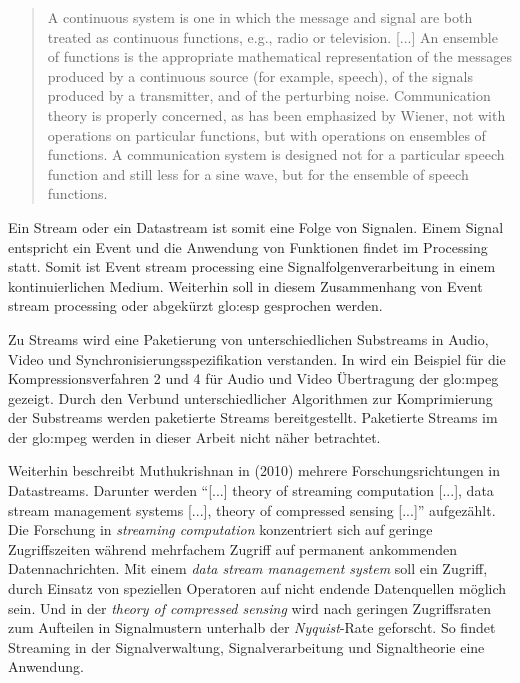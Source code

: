 \blockquote{A continuous system is one in which the message and signal are both treated as continuous functions, e.g., radio or television. [...]
An ensemble of functions is the appropriate mathematical representation of the messages produced by
a continuous source (for example, speech), of the signals produced by a transmitter, and of the perturbing
noise. Communication theory is properly concerned, as has been emphasized by Wiener, not with operations
on particular functions, but with operations on ensembles of functions. A communication system is designed
not for a particular speech function and still less for a sine wave, but for the ensemble of speech functions.}

Ein Stream oder ein Datastream ist somit eine Folge von Signalen. Einem Signal entspricht ein Event und die Anwendung von Funktionen findet im Processing statt. Somit ist Event stream processing eine Signalfolgenverarbeitung in einem kontinuierlichen Medium. Weiterhin soll in diesem Zusammenhang von Event stream processing oder abgekürzt \acrshort{glo:esp} gesprochen werden.

Zu Streams wird eine Paketierung von unterschiedlichen Substreams in Audio, Video und Synchronisierungsspezifikation verstanden. In  wird ein Beispiel für die Kompressionsverfahren 2 und 4 für Audio und Video Übertragung der \gls{glo:mpeg} gezeigt. Durch den Verbund unterschiedlicher Algorithmen zur Komprimierung der Substreams werden paketierte Streams bereitgestellt. Paketierte Streams im der \gls{glo:mpeg} werden in dieser Arbeit nicht näher betrachtet.

Weiterhin beschreibt Muthukrishnan in  (2010) mehrere Forschungsrichtungen in Datastreams. Darunter werden \enquote{[...] theory of streaming computation [...], data stream management systems [...], theory of compressed sensing [...]}  aufgezählt. Die Forschung in \textit{streaming computation} konzentriert sich auf geringe Zugriffszeiten während mehrfachem Zugriff auf permanent ankommenden Datennachrichten. Mit einem \textit{data stream management system} soll ein Zugriff, durch Einsatz von speziellen Operatoren auf nicht endende Datenquellen möglich sein. Und in der \textit{theory of compressed sensing} wird nach geringen Zugriffsraten zum Aufteilen in Signalmustern unterhalb der \textit{Nyquist}-Rate geforscht. So findet Streaming in der Signalverwaltung, Signalverarbeitung und Signaltheorie eine Anwendung.

